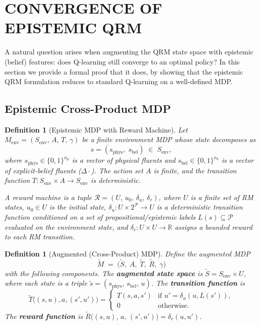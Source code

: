 \documentclass[letterpaper, 10 pt, conference]{ieeeconf}  %
\newtheorem{definition}[theorem]{Definition}
\newcommand{\EBel}[1]{\ensuremath{\Delta #1}} %
\begin{document}
\section{CONVERGENCE OF EPISTEMIC QRM}
\label{sec:convergence}

A natural question arises when augmenting the QRM state space with epistemic (belief) features: does Q-learning still converge to an optimal policy?
In this section we provide a formal proof that it does, by showing that the epistemic QRM formulation reduces to standard Q-learning on a well-defined MDP.

\subsection{Epistemic Cross-Product MDP}

\begin{definition}[Epistemic MDP with Reward Machine]
\label{def:epi-mdp}
Let $M_{\mathrm{env}} = (S_{\mathrm{env}},\, A,\, T,\, \gamma)$ be a finite environment MDP whose state decomposes as
\[
    s = (s_{\mathrm{phys}},\; s_{\mathrm{bel}}) \;\in\; S_{\mathrm{env}},
\]
where $s_{\mathrm{phys}} \in \{0,1\}^{n_p}$ is a vector of physical fluents and $s_{\mathrm{bel}} \in \{0,1\}^{n_b}$ is a vector of explicit-belief fluents ($\EBel{\cdot}$).  The action set $A$ is finite, and the transition function $T : S_{\mathrm{env}} \times A \to S_{\mathrm{env}}$ is deterministic.

A \emph{reward machine} is a tuple $\mathcal{R} = (U,\, u_0,\, \delta_u,\, \delta_r)$, where $U$ is a finite set of RM states, $u_0 \in U$ is the initial state, $\delta_u : U \times 2^{\mathcal{P}} \to U$ is a deterministic transition function conditioned on a set of propositional/epistemic labels $L(s) \subseteq \mathcal{P}$ evaluated on the environment state, and $\delta_r : U \times U \to \mathbb{R}$ assigns a bounded reward to each RM transition.
\end{definition}

\begin{definition}[Augmented (Cross-Product) MDP]
\label{def:cross-product}
Define the augmented MDP
\[
    \tilde{M} \;=\; \bigl(\tilde{S},\; A,\; \tilde{T},\; \tilde{R},\; \gamma\bigr)
\]
with the following components.
The \textbf{augmented state space} is $\tilde{S} = S_{\mathrm{env}} \times U$, where each state is a triple $\tilde{s} = (s_{\mathrm{phys}},\, s_{\mathrm{bel}},\, u)$.
The \textbf{transition function} is
\[
    \tilde{T}\!\bigl((s,u),a,(s',u')\bigr) \!=\!
    \begin{cases}
        T(s,a,s') & \text{if } u' = \delta_u(u,L(s')), \\
        0 & \text{otherwise}.
    \end{cases}
\]
The \textbf{reward function} is
$\tilde{R}\bigl((s, u),\, a,\, (s', u')\bigr) = \delta_r(u, u')$.
\end{definition}
\end{document}
